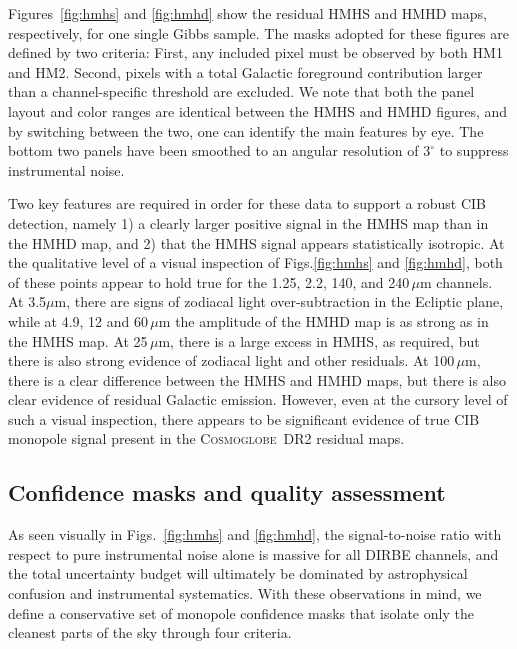 \documentclass{aa}
\newcommand{\cosmoglobe}{\textsc{Cosmoglobe}}
\begin{document}
Figures~\ref{fig:hmhs} and \ref{fig:hmhd} show the residual HMHS and
HMHD maps, respectively, for one single Gibbs sample. The masks
adopted for these figures are defined by two criteria: First, any
included pixel must be observed by both HM1 and HM2. Second, pixels
with a total Galactic foreground contribution larger than a
channel-specific threshold are excluded. We note that both the panel
layout and color ranges are identical between the HMHS and HMHD
figures, and by switching between the two, one can identify
the main features by eye. The bottom two panels have been smoothed to
an angular resolution of $3^{\circ}$ to suppress instrumental noise.

Two key features are required in order for these data to support a
robust CIB detection, namely 1) a clearly larger positive signal in
the HMHS map than in the HMHD map, and 2) that the HMHS signal appears
statistically isotropic. At the qualitative level of a visual
inspection of Figs.\ref{fig:hmhs} and \ref{fig:hmhd}, both of these
points appear to hold true for the 1.25, 2.2, 140, and
240\,$\mu\mathrm{m}$ channels. At 3.5$\mu\mathrm{m}$, there are signs
of zodiacal light over-subtraction in the Ecliptic plane, while at
4.9, 12 and 60\,$\mu\mathrm{m}$ the amplitude of the HMHD map is as
strong as in the HMHS map. At 25\,$\mu\mathrm{m}$, there is a large
excess in HMHS, as required, but there is also strong evidence of
zodiacal light and other residuals. At 100\,$\mu\mathrm{m}$, there is
a clear difference between the HMHS and HMHD maps, but there is also
clear evidence of residual Galactic emission. However, even at the
cursory level of such a visual inspection, there appears to be
significant evidence of true CIB monopole signal present in the
\cosmoglobe\ DR2 residual maps.

\subsection{Confidence masks and quality assessment}
\label{sec:masks}

As seen visually in Figs.~\ref{fig:hmhs} and \ref{fig:hmhd}, the
signal-to-noise ratio with respect to pure instrumental noise alone is
massive for all DIRBE channels, and the total uncertainty budget will
ultimately be dominated by astrophysical confusion and instrumental
systematics. With these observations in mind, we define a conservative
set of monopole confidence masks that isolate only the cleanest parts
of the sky through four criteria.
\end{document}
